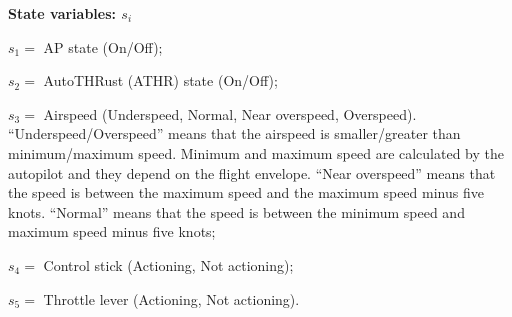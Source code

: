 %    

\textbf{State variables: $s_i$}

\begin{description}
\item $s_1=$ AP state (On/Off);
\item $s_2=$ AutoTHRust (ATHR) state (On/Off);
\item $s_3=$ Airspeed (Underspeed, Normal, Near overspeed, Overspeed). 
``Underspeed/Overspeed'' means that the airspeed is smaller/greater 
than minimum/maximum speed. 
Minimum and maximum speed are calculated by the autopilot 
and they depend on the flight envelope. 
``Near overspeed'' means that the speed is between the maximum speed 
and the maximum speed minus five knots. 
``Normal'' means that the speed is between the minimum speed 
and maximum speed minus five knots;
\item $s_4=$ Control stick (Actioning, Not actioning);
\item $s_5=$ Throttle lever (Actioning, Not actioning).
\end{description}

